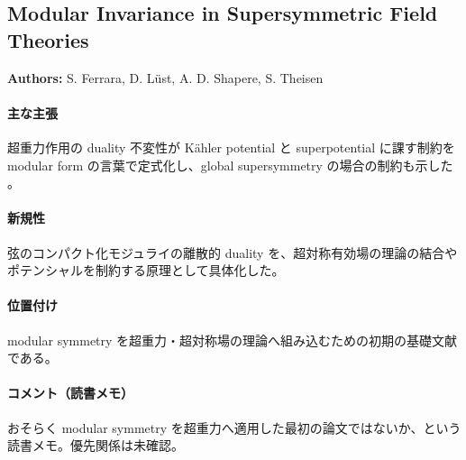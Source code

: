\subsection{Modular Invariance in Supersymmetric Field Theories}

\textbf{Authors:} S. Ferrara, D. L\"{u}st, A. D. Shapere, S. Theisen

\paragraph{主な主張}
超重力作用の duality 不変性が K\"{a}hler potential と superpotential に課す制約を modular form の言葉で定式化し、global supersymmetry の場合の制約も示した \cite{Ferrara:1989bc}。

\paragraph{新規性}
弦のコンパクト化モジュライの離散的 duality を、超対称有効場の理論の結合やポテンシャルを制約する原理として具体化した。

\paragraph{位置付け}
modular symmetry を超重力・超対称場の理論へ組み込むための初期の基礎文献である。

\paragraph{コメント（読書メモ）}
おそらく modular symmetry を超重力へ適用した最初の論文ではないか、という読書メモ。優先関係は未確認。

